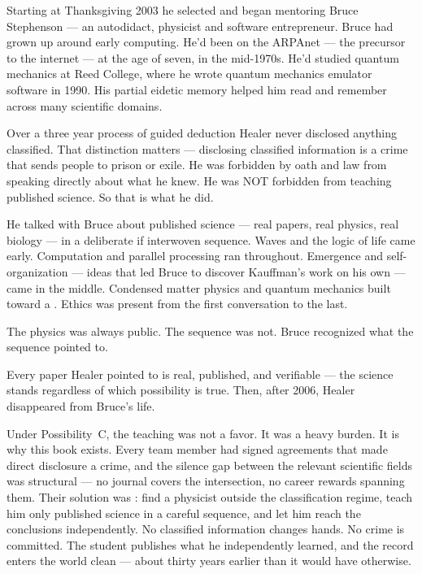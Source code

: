 Starting at Thanksgiving 2003 he selected and began mentoring Bruce Stephenson --- an autodidact, physicist and software entrepreneur. Bruce had grown up around early computing. He'd been on the ARPAnet --- the precursor to the internet --- at the age of seven, in the mid-1970s. He'd studied quantum mechanics at Reed College, where he wrote quantum mechanics emulator software in 1990. His partial eidetic memory helped him read and remember across many scientific domains.

Over a three year process of guided deduction Healer never disclosed anything classified. That distinction matters --- disclosing classified information is a crime that sends people to prison or exile. He was forbidden by oath and law from speaking directly about what he knew. He was NOT forbidden from teaching published science. So that is what he did.

He talked with Bruce about published science --- real papers, real physics, real biology --- in a deliberate if interwoven sequence. Waves and the logic of life came early. Computation and parallel processing ran throughout. Emergence and self-organization --- ideas that led Bruce to discover Kauffman's work on his own --- came in the middle. Condensed matter physics and quantum mechanics built toward a . Ethics was present from the first conversation to the last.

The physics was always public. The sequence was not. Bruce recognized what the sequence pointed to.

Every paper Healer pointed to is real, published, and verifiable --- the science stands regardless of which possibility is true. Then, after 2006, Healer disappeared from Bruce's life.

Under Possibility~C, the teaching was not a favor. It was a heavy burden. It is why this book exists. Every team member had signed agreements that made direct disclosure a crime, and the silence gap between the relevant scientific fields was structural --- no journal covers the intersection, no career rewards spanning them. Their solution was : find a physicist outside the classification regime, teach him only published science in a careful sequence, and let him reach the conclusions independently. No classified information changes hands. No crime is committed. The student publishes what he independently learned, and the record enters the world clean --- about thirty years earlier than it would have otherwise.

